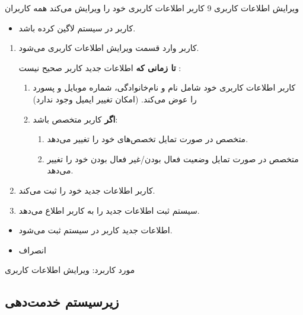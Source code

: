 {
	\usecase
	{ویرایش اطلاعات کاربری}
	{9}
	{کاربر اطلاعات کاربری خود را ویرایش می‌کند}
	{همه کاربران}
	{}
	{
		\begin{itemize}
			\item 
		کاربر در سیستم لاگین کرده باشد.
			
		\end{itemize}
	}
	{
		\begin{enumerate}
			\item 
	کاربر وارد قسمت ویرایش اطلاعات کاربری می‌شود.
	
	\textbf{تا زمانی که} اطلاعات جدید کاربر صحیح نیست :
	
	\begin{enumerate}[label=\theenumi.\arabic*.]
			\item
	کاربر اطلاعات کاربری خود شامل نام و نام‌خانوادگی، شماره موبایل و پسورد را عوض می‌کند. (امکان تغییر ایمیل وجود ندارد)
			
			\item
			\textbf{اگر} کاربر متخصص باشد:
			\begin{enumerate}
				\item 
				متخصص در صورت تمایل تخصص‌های خود را تغییر می‌دهد.
				
								\item 
				متخصص در صورت تمایل وضعیت فعال بودن/غیر فعال بودن خود را تغییر می‌دهد.
			\end{enumerate}
			
			\end{enumerate}
		
			\item
			کاربر اطلاعات جدید خود را ثبت می‌کند.
			
			\item
			سیستم ثبت اطلاعات جدید را به کاربر اطلاع می‌دهد.
			
		\end{enumerate}
	}
	{\begin{itemize}
			\item
			اطلاعات جدید کاربر در سیستم ثبت می‌شود.
	\end{itemize}}
	{
		\begin{itemize}
			\item انصراف
		\end{itemize}
	}
	{مورد کاربرد: ویرایش اطلاعات کاربری}
	
	
	
}


\newpage
\subsection{زیرسیستم خدمت‌دهی}

